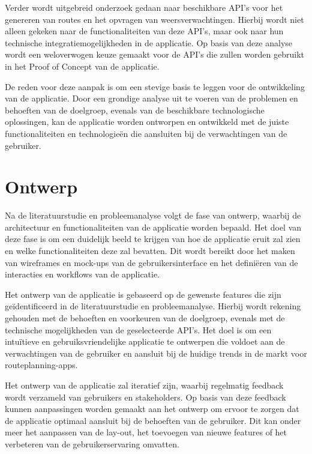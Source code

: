 Verder wordt uitgebreid onderzoek gedaan naar beschikbare API's voor het genereren van routes en het opvragen van weersverwachtingen. 
Hierbij wordt niet alleen gekeken naar de functionaliteiten van deze API's, maar ook naar hun technische integratiemogelijkheden in de applicatie. 
Op basis van deze analyse wordt een weloverwogen keuze gemaakt voor de API's die zullen worden gebruikt in het Proof of Concept van de applicatie.

De reden voor deze aanpak is om een stevige basis te leggen voor de ontwikkeling van de applicatie. 
Door een grondige analyse uit te voeren van de problemen en behoeften van de doelgroep, evenals van de beschikbare technologische oplossingen, 
kan de applicatie worden ontworpen en ontwikkeld met de juiste functionaliteiten en technologieën die aansluiten bij de verwachtingen van de gebruiker.

\section{Ontwerp}

Na de literatuurstudie en probleemanalyse volgt de fase van ontwerp, waarbij de architectuur en functionaliteiten van de applicatie worden bepaald. 
Het doel van deze fase is om een duidelijk beeld te krijgen van hoe de applicatie eruit zal zien en welke functionaliteiten deze zal bevatten. 
Dit wordt bereikt door het maken van wireframes en mock-ups van de gebruikersinterface en het definiëren van de interacties en workflows van de applicatie.

Het ontwerp van de applicatie is gebaseerd op de gewenste features die zijn geïdentificeerd in de literatuurstudie en probleemanalyse. 
Hierbij wordt rekening gehouden met de behoeften en voorkeuren van de doelgroep, evenals met de technische mogelijkheden van de geselecteerde API's. 
Het doel is om een intuïtieve en gebruiksvriendelijke applicatie te ontwerpen die voldoet aan de verwachtingen van de gebruiker en aansluit bij de huidige trends in de markt voor routeplanning-apps.

Het ontwerp van de applicatie zal iteratief zijn, waarbij regelmatig feedback wordt verzameld van gebruikers en stakeholders. 
Op basis van deze feedback kunnen aanpassingen worden gemaakt aan het ontwerp om ervoor te zorgen dat de applicatie optimaal aansluit bij de behoeften van de gebruiker. 
Dit kan onder meer het aanpassen van de lay-out, het toevoegen van nieuwe features of het verbeteren van de gebruikerservaring omvatten.

